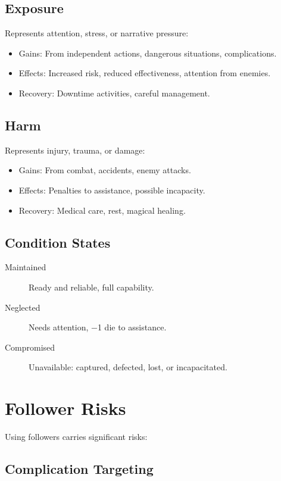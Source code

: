 \documentclass[11pt,twoside,openany]{book}
\begin{document}
\subsection*{Exposure}

Represents attention, stress, or narrative pressure:
\begin{itemize}
\item Gains: From independent actions, dangerous situations, complications.
\item Effects: Increased risk, reduced effectiveness, attention from enemies.
\item Recovery: Downtime activities, careful management.
\end{itemize}

\subsection*{Harm}

Represents injury, trauma, or damage:
\begin{itemize}
\item Gains: From combat, accidents, enemy attacks.
\item Effects: Penalties to assistance, possible incapacity.
\item Recovery: Medical care, rest, magical healing.
\end{itemize}

\subsection*{Condition States}

\begin{description}
\item[Maintained] Ready and reliable, full capability.
\item[Neglected] Needs attention, −1 die to assistance.
\item[Compromised] Unavailable: captured, defected, lost, or incapacitated.
\end{description}

\section*{Follower Risks} 

Using followers carries significant risks:

\subsection*{Complication Targeting}
\end{document}
